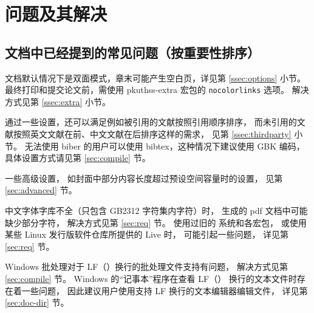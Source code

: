 %
%
%
%
%

\chapter{问题及其解决}
	\section{文档中已经提到的常见问题（按重要性排序）}

	文档默认情况下是双面模式，章末可能产生空白页，详见第 \ref{ssec:options} 小节。
	最终打印和提交论文前，需使用 pkuthss-extra 宏包的 \verb|nocolorlinks| 选项。
	解决方式见第 \ref{ssec:extra} 小节。

	通过一些设置，还可以满足例如被引用的文献按照引用顺序排序，
	而未引用的文献按照英文文献在前、中文文献在后排序这样的需求，
	见第 \ref{ssec:thirdparty} 小节。
	无法使用 biber 的用户可以使用 bibtex，这种情况下建议使用 GBK 编码，
	具体设置方式请见第 \ref{sec:compile} 节。

	一些高级设置，
	如封面中部分内容长度超过预设空间容量时的设置，
	见第 \ref{sec:advanced} 节。

	中文字体字库不全（只包含 GB2312 字符集内字符）时，
	生成的 pdf 文档中可能缺少部分字符，
	解决方式见第 \ref{sec:req} 节。
	使用过旧的  系统和各宏包，
	或使用某些 Linux 发行版软件仓库所提供的  Live 时，
	可能引起一些问题，
	详见第 \ref{sec:req} 节。

	Windows 批处理对于 LF（\texttt{\string\n}）换行的批处理文件支持有问题，
	解决方式见第 \ref{sec:compile} 节。
	Windows 的“记事本”程序在查看 LF（\texttt{\string\n}）
	换行的文本文件时存在着一些问题，
	因此建议用户使用支持 LF 换行的文本编辑器编辑文件，
	详见第 \ref{sec:doc-dir} 节。

